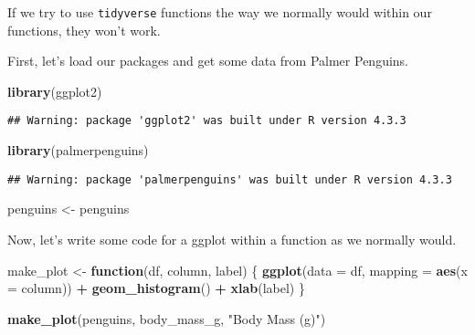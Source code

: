 \documentclass[
]{article}
\newenvironment{Shaded}{\begin{snugshade}}{\end{snugshade}}
\newcommand{\AttributeTok}[1]{\textcolor[rgb]{0.13,0.29,0.53}{#1}}
\newcommand{\ControlFlowTok}[1]{\textcolor[rgb]{0.13,0.29,0.53}{\textbf{#1}}}
\newcommand{\FunctionTok}[1]{\textcolor[rgb]{0.13,0.29,0.53}{\textbf{#1}}}
\newcommand{\NormalTok}[1]{#1}
\newcommand{\OtherTok}[1]{\textcolor[rgb]{0.56,0.35,0.01}{#1}}
\newcommand{\SpecialCharTok}[1]{\textcolor[rgb]{0.81,0.36,0.00}{\textbf{#1}}}
\newcommand{\StringTok}[1]{\textcolor[rgb]{0.31,0.60,0.02}{#1}}
\begin{document}
If we try to use \texttt{tidyverse} functions the way we normally would
within our functions, they won't work.

First, let's load our packages and get some data from Palmer Penguins.

\begin{Shaded}
\begin{Highlighting}[]
\FunctionTok{library}\NormalTok{(ggplot2)}
\end{Highlighting}
\end{Shaded}

\begin{verbatim}
## Warning: package 'ggplot2' was built under R version 4.3.3
\end{verbatim}

\begin{Shaded}
\begin{Highlighting}[]
\FunctionTok{library}\NormalTok{(palmerpenguins)}
\end{Highlighting}
\end{Shaded}

\begin{verbatim}
## Warning: package 'palmerpenguins' was built under R version 4.3.3
\end{verbatim}

\begin{Shaded}
\begin{Highlighting}[]
\NormalTok{penguins }\OtherTok{\textless{}{-}}\NormalTok{ penguins}
\end{Highlighting}
\end{Shaded}

Now, let's write some code for a ggplot within a function as we normally
would.

\begin{Shaded}
\begin{Highlighting}[]
\NormalTok{make\_plot }\OtherTok{\textless{}{-}} \ControlFlowTok{function}\NormalTok{(df, column, label) \{}
  \FunctionTok{ggplot}\NormalTok{(}\AttributeTok{data =}\NormalTok{ df, }\AttributeTok{mapping =} \FunctionTok{aes}\NormalTok{(}\AttributeTok{x =}\NormalTok{ column)) }\SpecialCharTok{+}
    \FunctionTok{geom\_histogram}\NormalTok{() }\SpecialCharTok{+}
    \FunctionTok{xlab}\NormalTok{(label)}
\NormalTok{\}}

\FunctionTok{make\_plot}\NormalTok{(penguins, body\_mass\_g, }\StringTok{"Body Mass (g)"}\NormalTok{)}
\end{Highlighting}
\end{Shaded}
\end{document}
